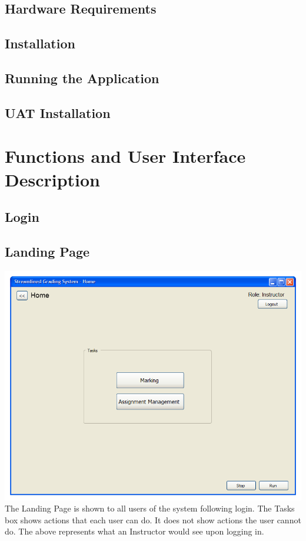 \documentclass{article}
\begin{document}
\subsection{Hardware Requirements}

\subsection{Installation}

\subsection{Running the Application}

\subsection{UAT Installation}

\section{Functions and User Interface Description}  %
\subsection{Login}

\subsection{Landing Page}
\includegraphics[scale=0.55]{../images/UIMockups/PNG_Renders/LandingPage}
The Landing Page is shown to all users of the system following login.  The Tasks
box shows actions that each user can do.  It does not show actions the user
cannot do. The above represents what an Instructor would see upon logging in.
\end{document}
